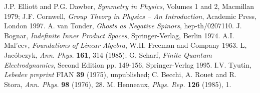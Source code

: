 \documentclass[a4paper,dvips,12pt]{article}
\begin{document}
    \begin{thebibliography}{99}
            J.P. Elliott and P.G. Dawber,
            \textit{Symmetry in Physics}, Volumes 1 and 2, Macmillan
            1979;
            J.F. Cornwell, \textit{Group Theory in Physics -- An
            Introduction}, Academic Press, London 1997.
            A. van Tonder, \textit{Ghosts as Negative Spinors}, hep-th/0207110.
            J. Bognar, \textit{Indefinite Inner Product Spaces},
            Springer-Verlag, Berlin 1974.
            A.I. Mal'cev, \textit{Foundations of Linear Algebra},
            W.H. Freeman and Company 1963.
            L, Jac\'obczyk,
            \textit{Ann. Phys.} \textbf{161}, 314 (1985);
            G. Scharf, \textit{Finite Quantum Electrodynamics}, Second Edition
            pp. 149-156, Springer-Verlag 1995.
            I.V. Tyutin, \textit{Lebedev preprint} FIAN \textbf{39} (1975),
            unpublished;
            C. Becchi, A. Rouet and R. Stora, \textit{Ann. Phys.} \textbf{98} (1976),
            28.
            M. Henneaux, \textit {Phys. Rep.} \textbf{126} (1985), 1.
    \end{thebibliography}
\end{document}
